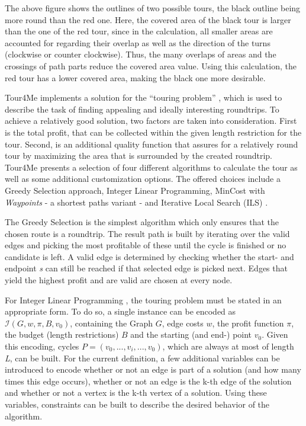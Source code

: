 The above figure shows the outlines of two possible tours, the black outline being more round than the red one. 
Here, the covered area of the black tour is larger than the one of the red tour, since in the calculation, all smaller areas are accounted for regarding their overlap as well as the direction of the turns (clockwise or counter clockwise).
Thus, the many overlaps of areas and the crossings of path parts reduce the covered area value.
Using this calculation, the red tour has a lower covered area, making the black one more desirable.



Tour4Me implements a solution for the \enquote{touring problem} , which is used to describe the task of finding appealing and ideally interesting roundtrips.
To achieve a relatively good solution, two factors are taken into consideration.
First is the total profit, that can be collected within the given length restriction for the tour.
Second, is an additional quality function that assures for a relatively round tour by maximizing the area that is surrounded by the created roundtrip.
Tour4Me presents a selection of four different algorithms to calculate the tour as well as some additional customization options.
The offered choices include a Greedy Selection approach, Integer Linear Programming, MinCost with \textit{Waypoints} - a shortest paths variant - and Iterative Local Search (ILS) \cite{buchin_tour4me_2022}. 

The Greedy Selection \cite{buchin_tour4me_2022, wayahdi_greedy_2021} is the simplest algorithm which only ensures that the chosen route is a roundtrip.
The result path is built by iterating over the valid edges and picking the most profitable of these until the cycle is finished or no candidate is left.
A valid edge is determined by checking whether the start- and endpoint \textit{s} can still be reached if that selected edge is picked next. 
Edges that yield the highest profit and are valid are chosen at every node.


For Integer Linear Programming \cite{buchin_tour4me_2022, graver_foundations_1975}, the touring problem must be stated in an appropriate form.
To do so, a single instance can be encoded as $\mathcal{I}(G, w, \pi, B, v_0)$, containing the Graph $G$, edge costs $w$, the profit function $\pi$, the budget (length restrictions) $B$ and the starting (and end-) point $v_0$.
Given this encoding, cycles $P=(v_0,...,v_i,...,v_0)$, which are always at most of length \textit{L}, can be built.
For the current definition, a few additional variables can be introduced to encode whether or not an edge is part of a solution (and how many times this edge occurs), whether or not an edge is the k-th edge of the solution and whether or not a vertex is the k-th vertex of a solution. 
Using these variables, constraints can be built to describe the desired behavior of the algorithm.

